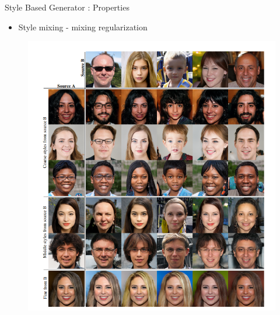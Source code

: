 \begin{frame}[fragile]{Style Based Generator : Properties }
        \begin{itemize}
        \item Style mixing - mixing regularization
    \end{itemize}
    \begin{figure}[ht]
         \hspace*{-1cm}\includegraphics[width=0.6\linewidth]{stylemixing.png} \\ \\ \\ \\ \\
    \end{figure}

\end{frame}

